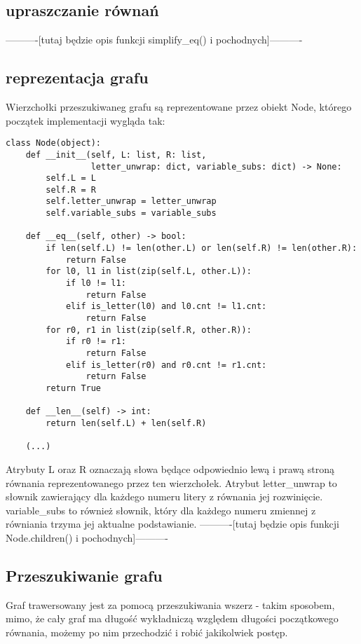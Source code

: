 \documentclass[leqno, 12pt]{article}
\begin{document}
\subsection{upraszczanie równań}
----------[tutaj będzie opis funkcji simplify\_eq() i pochodnych]----------

\subsection{reprezentacja grafu}
Wierzchołki przeszukiwaneg grafu są reprezentowane przez obiekt Node, którego początek implementacji wygląda tak:
\begin{verbatim}
class Node(object):
    def __init__(self, L: list, R: list, 
                 letter_unwrap: dict, variable_subs: dict) -> None:
        self.L = L
        self.R = R
        self.letter_unwrap = letter_unwrap
        self.variable_subs = variable_subs

    def __eq__(self, other) -> bool:
        if len(self.L) != len(other.L) or len(self.R) != len(other.R):
            return False
        for l0, l1 in list(zip(self.L, other.L)):
            if l0 != l1:
                return False
            elif is_letter(l0) and l0.cnt != l1.cnt:
                return False
        for r0, r1 in list(zip(self.R, other.R)):
            if r0 != r1:
                return False
            elif is_letter(r0) and r0.cnt != r1.cnt:
                return False
        return True

    def __len__(self) -> int:
        return len(self.L) + len(self.R)

    (...)
\end{verbatim}
Atrybuty L oraz R oznaczają słowa będące odpowiednio lewą i prawą stroną równania reprezentowanego przez ten wierzchołek. Atrybut letter\_unwrap to słownik zawierający dla każdego numeru litery z równania jej rozwinięcie. variable\_subs to również słownik, który dla każdego numeru zmiennej z równiania trzyma jej aktualne podstawianie.
\newline\newline
----------[tutaj będzie opis funkcji Node.children() i pochodnych]----------

\subsection{Przeszukiwanie grafu}
Graf trawersowany jest za pomocą przeszukiwania wszerz - takim sposobem, mimo, że cały graf ma długość wykładniczą względem długości początkowego równania, możemy po nim przechodzić i robić jakikolwiek postęp.
\end{document}
